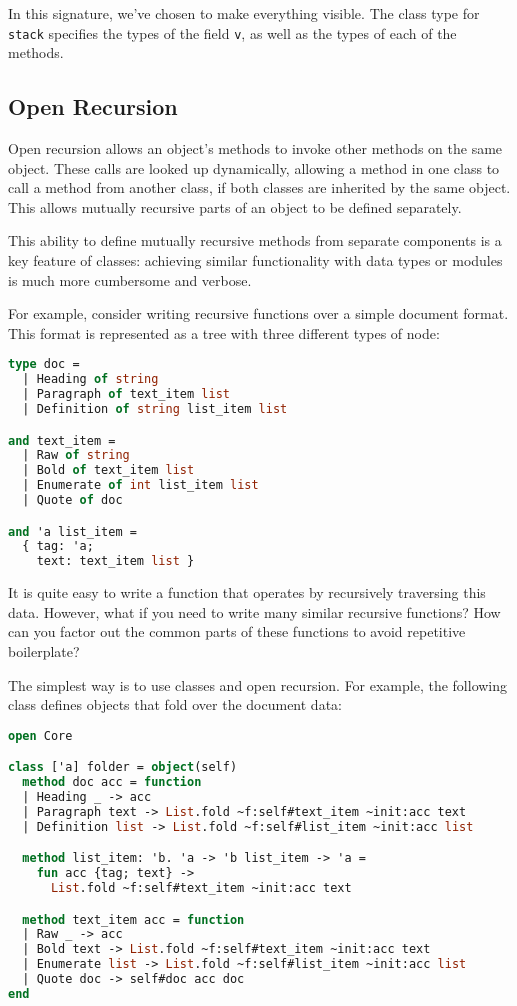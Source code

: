 In this signature, we've chosen to make everything visible. The class
type for \passthrough{\lstinline!stack!} specifies the types of the
field \passthrough{\lstinline!v!}, as well as the types of each of the
methods.

\hypertarget{open-recursion}{%
\subsection{Open Recursion}\label{open-recursion}}

Open recursion allows an object's methods to invoke other methods on the
same object. These calls are looked up dynamically, allowing a method in
one class to call a method from another class, if both classes are
inherited by the same object. This allows mutually recursive parts of an
object to be defined separately.

This ability to define mutually recursive methods from separate
components is a key feature of classes: achieving similar functionality
with data types or modules is much more cumbersome and verbose.

For example, consider writing recursive functions over a simple document
format. This format is represented as a tree with three different types
of node:

\begin{lstlisting}[language=Caml]
type doc =
  | Heading of string
  | Paragraph of text_item list
  | Definition of string list_item list

and text_item =
  | Raw of string
  | Bold of text_item list
  | Enumerate of int list_item list
  | Quote of doc

and 'a list_item =
  { tag: 'a;
    text: text_item list }
\end{lstlisting}

It is quite easy to write a function that operates by recursively
traversing this data. However, what if you need to write many similar
recursive functions? How can you factor out the common parts of these
functions to avoid repetitive boilerplate?

The simplest way is to use classes and open recursion. For example, the
following class defines objects that fold over the document data:

\begin{lstlisting}[language=Caml]
open Core

class ['a] folder = object(self)
  method doc acc = function
  | Heading _ -> acc
  | Paragraph text -> List.fold ~f:self#text_item ~init:acc text
  | Definition list -> List.fold ~f:self#list_item ~init:acc list

  method list_item: 'b. 'a -> 'b list_item -> 'a =
    fun acc {tag; text} ->
      List.fold ~f:self#text_item ~init:acc text

  method text_item acc = function
  | Raw _ -> acc
  | Bold text -> List.fold ~f:self#text_item ~init:acc text
  | Enumerate list -> List.fold ~f:self#list_item ~init:acc list
  | Quote doc -> self#doc acc doc
end
\end{lstlisting}

